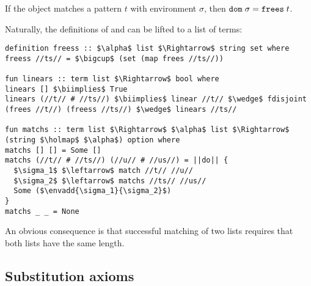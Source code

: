 \begin{corollary}\label{thm:terms:algebra:match-dom}
  If the object matches a pattern $t$ with environment $\sigma$, then $\texttt{\textup{dom}}\;\sigma = \texttt{\textup{frees}}\;t$.
\end{corollary}

\noindent
Naturally, the definitions of  and  can be lifted to a list of terms:
%
\begin{lstlisting}[language=Isabelle]
definition freess :: $\alpha$ list $\Rightarrow$ string set where
freess //ts// = $\bigcup$ (set (map frees //ts//))

fun linears :: term list $\Rightarrow$ bool where
linears [] $\biimplies$ True
linears (//t// # //ts//) $\biimplies$ linear //t// $\wedge$ fdisjoint (frees //t//) (freess //ts//) $\wedge$ linears //ts//

fun matchs :: term list $\Rightarrow$ $\alpha$ list $\Rightarrow$ (string $\holmap$ $\alpha$) option where
matchs [] [] = Some []
matchs (//t// # //ts//) (//u// # //us//) = ||do|| {
  $\sigma_1$ $\leftarrow$ match //t// //u//
  $\sigma_2$ $\leftarrow$ matchs //ts// //us//
  Some ($\envadd{\sigma_1}{\sigma_2}$)
}
matchs _ _ = None
\end{lstlisting}
%
An obvious consequence is that successful matching of two lists requires that both lists have the same length.

\subsection{Substitution axioms}
\label{sec:terms:algebra:subst}

